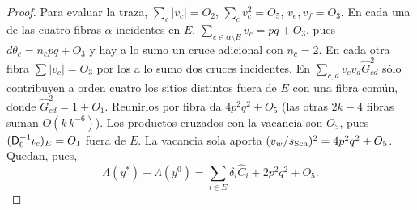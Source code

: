 \begin{proof}
Para evaluar la traza, $\sum_c|v_c|=O_2$, $\sum_c v_c^2=O_5$, $v_e,v_f=O_3$.
En cada una de las cuatro fibras $\alpha$ incidentes en $E$,
$\sum_{c\in\alpha\setminus E}v_c=pq+O_3$, pues $d\theta_c=n_cpq+O_3$ y hay a lo sumo un cruce adicional
con $n_c=2$. En cada otra fibra $\sum|v_c|=O_3$ por los a lo sumo dos cruces incidentes.
En $\sum_{c,d}v_cv_d\widehat G_{cd}^2$ sólo contribuyen a orden cuatro los sitios distintos
fuera de $E$ con una fibra común, donde $\widehat G_{cd}^2=1+O_1$. Reunirlos por fibra
da $4p^2q^2+O_5$ (las otras $2k-4$ fibras suman $O(k\,k^{-6})$).
Los productos cruzados con la vacancia son $O_5$, pues $(\mathsf D_0^{-1}\iota_c)_E=O_1$ fuera de $E$.
La vacancia sola aporta $(v_w/s_{\mathrm{Sch}})^2=4p^2q^2+O_5$. Quedan, pues,
\[
 \Lambda(y^*)-\Lambda(y^0)=\sum_{i\in E}\delta_i\widehat C_i+2p^2q^2+O_5 .
\]
\end{proof}
